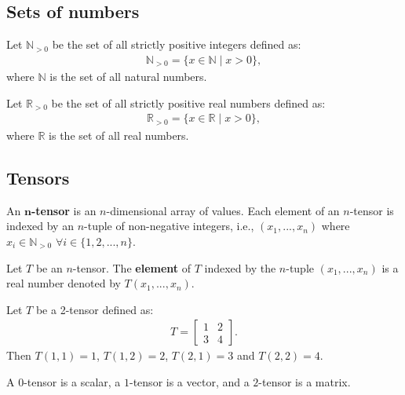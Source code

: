 \documentclass[twoside,11pt]{article}
\begin{document}
\subsection*{Sets of numbers}

\begin{definition}
Let $\mathbb{N}_{>0}$ be the set of all strictly positive integers defined as:
\begin{align}
\mathbb{N}_{>0} = \{ x \in \mathbb{N} \mid x > 0 \},
\end{align}
where $\mathbb{N}$ is the set of all natural numbers.
\end{definition}

\begin{definition}
Let $\mathbb{R}_{>0}$ be the set of all strictly positive real numbers defined as:
\begin{align}
\mathbb{R}_{>0} = \{ x \in \mathbb{R} \mid x > 0 \},
\end{align}
where $\mathbb{R}$ is the set of all real numbers.
\end{definition}

\subsection*{Tensors}

\begin{definition}
An $\bm{n}$\textbf{-tensor} is an $n$-dimensional array of values. Each element of an $n$-tensor is indexed by an $n$-tuple of non-negative integers, i.e., $(x_1, ..., x_n)$ where $x_i \in \mathbb{N}_{>0} \,\, \forall i \in \{1,2,...,n\}$.
\end{definition}

\begin{definition}
Let $T$ be an $n$-tensor. The \textbf{element} of $T$ indexed by the $n$-tuple $(x_1, ..., x_n)$ is a real number denoted by $T(x_1, ..., x_n)$.
\end{definition}

\begin{example}
Let $T$ be a 2-tensor defined as:
\begin{align}
T = \begin{bmatrix}
1 & 2\\
3 & 4
\end{bmatrix}.
\end{align}
Then $T(1,1) = 1$, $T(1,2) = 2$, $T(2,1) = 3$ and $T(2,2) = 4$.
\end{example}

\begin{remark}
A $0$-tensor is a scalar, a $1$-tensor is a vector, and a $2$-tensor is a matrix.
\end{remark}
\end{document}
